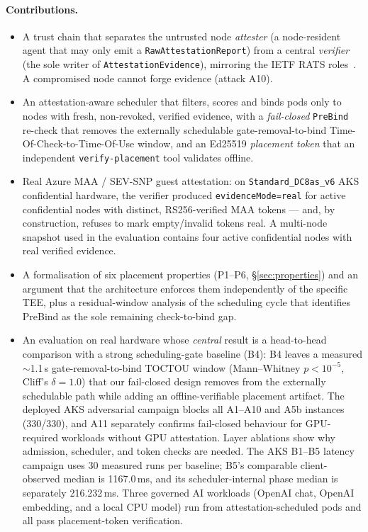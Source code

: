 \paragraph{Contributions.}
\begin{itemize}
  \item A trust chain that separates the untrusted node \emph{attester} (a
  node-resident agent that may only emit a \texttt{RawAttestationReport}) from a
  central \emph{verifier} (the sole writer of \texttt{AttestationEvidence}),
  mirroring the IETF RATS roles~\cite{birkholz2023rats}. A compromised node
  cannot forge evidence (attack A10).
  \item An attestation-aware scheduler that filters, scores and binds pods only
  to nodes with fresh, non-revoked, verified evidence, with a \emph{fail-closed}
  \texttt{PreBind} re-check that removes the externally schedulable
  gate-removal-to-bind Time-Of-Check-to-Time-Of-Use window, and an Ed25519
  \emph{placement token} that an independent
  \texttt{verify-placement} tool validates offline.
  \item Real Azure MAA / SEV-SNP guest attestation: on
  \texttt{Standard\_DC8as\_v6} AKS confidential hardware, the verifier produced
  \texttt{evidenceMode=real} for active confidential nodes with distinct,
  RS256-verified MAA tokens --- and, by construction, refuses to mark
  empty/invalid tokens real. A multi-node snapshot used in the evaluation
  contains four active confidential nodes with real verified evidence.
  \item A formalisation of six placement properties (P1--P6,
  \S\ref{sec:properties}) and an argument that the architecture enforces them
  independently of the specific TEE, plus a residual-window analysis of the
  scheduling cycle that identifies PreBind as the sole remaining check-to-bind
  gap.
  \item An evaluation on real hardware whose \emph{central} result is a
  head-to-head comparison with a strong scheduling-gate baseline (B4): B4 leaves
  a measured $\sim$1.1\,s gate-removal-to-bind TOCTOU window (Mann--Whitney
  $p<10^{-5}$, Cliff's $\delta{=}1.0$) that our fail-closed design removes from
  the externally schedulable path while adding an offline-verifiable placement
  artifact. The deployed AKS adversarial campaign blocks all A1--A10 and A5b
  instances (330/330), and A11 separately confirms fail-closed behaviour for GPU-required
  workloads without GPU attestation. Layer ablations show why admission,
  scheduler, and token checks are needed. The AKS B1--B5 latency campaign uses
  30 measured runs per baseline; B5's comparable client-observed median is
  1167.0\,ms, and its scheduler-internal phase median is separately
  216.232\,ms.
  Three governed AI workloads (OpenAI chat, OpenAI embedding, and a local CPU
  model) run from attestation-scheduled pods and all pass placement-token
  verification.
\end{itemize}

